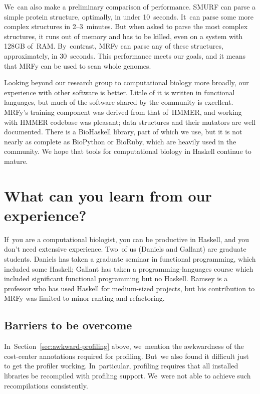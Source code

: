 \documentclass[preprint,nonatbib,blockstyle,nocopyrightspace,times]{sigplanconf}
\newcommand\secref[1]{Section~\ref{sec:#1}}
\begin{document}
We~can also make a preliminary comparison of performance.
SMURF can parse a simple protein structure, optimally, in under 10~seconds.
It~can parse some more complex structures in 2--3~minutes.
But when asked to parse the most complex structures, it runs out of
memory and has to be killed, even on a system with 128GB of~RAM.
By~contrast, MRFy can parse any of these structures, approximately,
in 30~seconds.
This performance
meets our goals, and it means that MRFy can be used to scan whole genomes.




Looking beyond our research group to computational biology more
broadly, our experience with other software is better.
Little of it is written in functional languages, 
but much of the software shared by the community is excellent.
MRFy's training component was derived from that of~HMMER,
and
working with HMMER 
codebase was pleasant;
data structures and their
mutators are well documented. 
There is a 
BioHaskell library, part of which we use,
but it is not nearly as 
complete as BioPython or BioRuby, which are heavily used in the community.
We hope that tools for computational biology in
Haskell continue to mature. 

\section{What can you learn from our experience?}

If~you are a computational biologist, 
you can be productive in Haskell, and you don't need extensive
experience.
Two~of us (Daniels and Gallant) are graduate students.
Daniels has taken a graduate seminar in functional programming, which
included some Haskell;
Gallant has taken a programming-languages course which included
significant functional programming but no Haskell.
Ramsey is a professor who has used Haskell 
for medium-sized projects,
but his contribution to MRFy was limited to minor ranting and refactoring.


\subsection{Barriers to be overcome}

In~\secref{awkward-profiling} above, we~mention the awkwardness of the
cost-center annotations required for profiling.
But~we also found it difficult just to get the profiler working.
In~particular, profiling requires that all installed libraries be recompiled
with profiling support.
We~were not able to achieve such recompilations consistently.
\end{document}
